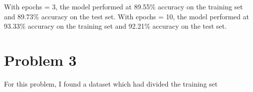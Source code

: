 \documentclass{article}
\numberwithin{equation}{section}
\numberwithin{equation}{section}
\begin{document}
With epochs = 3, the model performed at 89.55\% accuracy on the training set and 89.73\% accuracy on the test set. With epochs = 10, the model performed at 93.33\% accuracy on the training set and 92.21\% accuracy on the test set. 

\section{Problem 3}
For this problem, I found a dataset which had divided the training set 











\begin{comment}
\begin{figure}
	\centering
	\hspace*{-3.0cm}
	\texttt{[image: Q4.2M.png]}
	\\	
	\textbf{Fig.7:} Comparator for 3-bit signed integers, $a=-2=[1,1,0]$
	\\
	\label{fig:Fig.7}
\end{figure}
\end{comment}
\end{document}
